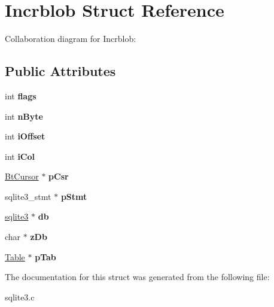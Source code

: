 \hypertarget{structIncrblob}{}\section{Incrblob Struct Reference}
\label{structIncrblob}


Collaboration diagram for Incrblob\+:
\subsection*{Public Attributes}
\begin{DoxyCompactItemize}
\item 
int {\bfseries flags}\hypertarget{structIncrblob_a46fa093e5241305f28d02926f8d0846f}{}\label{structIncrblob_a46fa093e5241305f28d02926f8d0846f}

\item 
int {\bfseries n\+Byte}\hypertarget{structIncrblob_ab1e1439df086208173fa97003f0ee02b}{}\label{structIncrblob_ab1e1439df086208173fa97003f0ee02b}

\item 
int {\bfseries i\+Offset}\hypertarget{structIncrblob_af8e71744f43178967460b9f402e7fafd}{}\label{structIncrblob_af8e71744f43178967460b9f402e7fafd}

\item 
int {\bfseries i\+Col}\hypertarget{structIncrblob_a398a322b061fb9952bc155026976ba51}{}\label{structIncrblob_a398a322b061fb9952bc155026976ba51}

\item 
\hyperlink{structBtCursor}{Bt\+Cursor} $\ast$ {\bfseries p\+Csr}\hypertarget{structIncrblob_af5a24b18473d1449c8c3fe7d826de59a}{}\label{structIncrblob_af5a24b18473d1449c8c3fe7d826de59a}

\item 
sqlite3\+\_\+stmt $\ast$ {\bfseries p\+Stmt}\hypertarget{structIncrblob_a8b7b39c9372db552add74c69f14a61a3}{}\label{structIncrblob_a8b7b39c9372db552add74c69f14a61a3}

\item 
\hyperlink{structsqlite3}{sqlite3} $\ast$ {\bfseries db}\hypertarget{structIncrblob_a9d3fe0b0229b75b9d0f9ee8e6545b5bc}{}\label{structIncrblob_a9d3fe0b0229b75b9d0f9ee8e6545b5bc}

\item 
char $\ast$ {\bfseries z\+Db}\hypertarget{structIncrblob_a908d355a5ea919ea43b0f8377b1d27de}{}\label{structIncrblob_a908d355a5ea919ea43b0f8377b1d27de}

\item 
\hyperlink{structTable}{Table} $\ast$ {\bfseries p\+Tab}\hypertarget{structIncrblob_a8e8527f370fa5798363ab789f5abe549}{}\label{structIncrblob_a8e8527f370fa5798363ab789f5abe549}

\end{DoxyCompactItemize}


The documentation for this struct was generated from the following file\+:\begin{DoxyCompactItemize}
\item 
sqlite3.\+c\end{DoxyCompactItemize}
